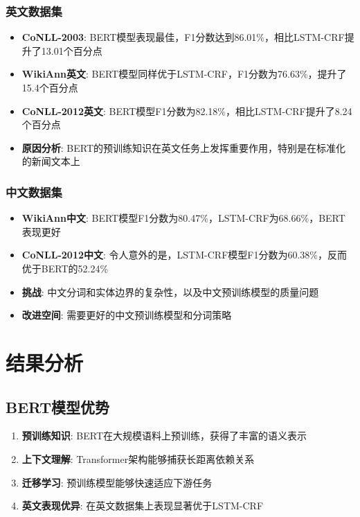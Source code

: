 \documentclass{article}
\begin{document}
\subsubsection{英文数据集}
\begin{itemize}
    \item \textbf{CoNLL-2003}: BERT模型表现最佳，F1分数达到86.01\%，相比LSTM-CRF提升了13.01个百分点
    \item \textbf{WikiAnn英文}: BERT模型同样优于LSTM-CRF，F1分数为76.63\%，提升了15.4个百分点
    \item \textbf{CoNLL-2012英文}: BERT模型F1分数为82.18\%，相比LSTM-CRF提升了8.24个百分点
    \item \textbf{原因分析}: BERT的预训练知识在英文任务上发挥重要作用，特别是在标准化的新闻文本上
\end{itemize}

\subsubsection{中文数据集}
\begin{itemize}
    \item \textbf{WikiAnn中文}: BERT模型F1分数为80.47\%，LSTM-CRF为68.66\%，BERT表现更好
    \item \textbf{CoNLL-2012中文}: 令人意外的是，LSTM-CRF模型F1分数为60.38\%，反而优于BERT的52.24\%
    \item \textbf{挑战}: 中文分词和实体边界的复杂性，以及中文预训练模型的质量问题
    \item \textbf{改进空间}: 需要更好的中文预训练模型和分词策略
\end{itemize}

\section{结果分析}

\subsection{BERT模型优势}

\begin{enumerate}
    \item \textbf{预训练知识}: BERT在大规模语料上预训练，获得了丰富的语义表示
    \item \textbf{上下文理解}: Transformer架构能够捕获长距离依赖关系
    \item \textbf{迁移学习}: 预训练模型能够快速适应下游任务
    \item \textbf{英文表现优异}: 在英文数据集上表现显著优于LSTM-CRF
\end{enumerate}
\end{document}
